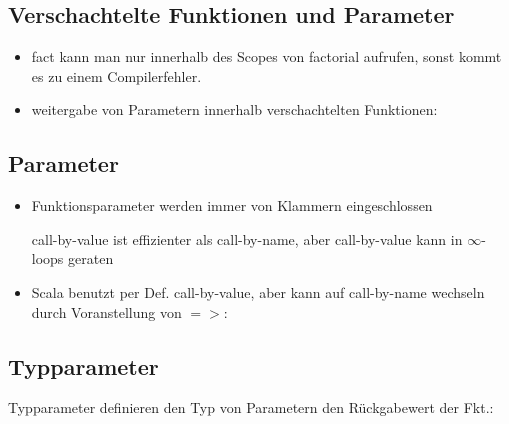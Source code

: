 \subsection{Verschachtelte Funktionen und Parameter}
\begin{itemize}
  \item   
  
  fact kann man nur innerhalb des Scopes von factorial aufrufen, sonst kommt
  es zu einem Compilerfehler.
  
  \item weitergabe von Parametern innerhalb verschachtelten Funktionen:
  
    

\end{itemize}


\subsection{Parameter}
\begin{itemize}
  \item Funktionsparameter werden immer von Klammern eingeschlossen
  
  
  call-by-value ist effizienter als call-by-name, aber call-by-value
  kann in $\infty$-loops geraten
    
  \item Scala benutzt per Def. call-by-value, aber kann auf call-by-name
  wechseln durch Voranstellung von $=>$:
  
  
  
\end{itemize}


\subsection{Typparameter}
Typparameter definieren den Typ von Parametern \oder den 
Rückgabewert der Fkt.:
  
